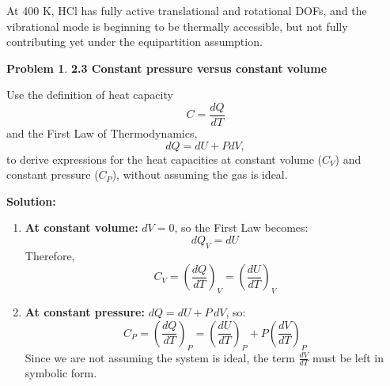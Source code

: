 \documentclass[12pt]{article}
\title{}
\author{Jerich Lee}
\date{\today}
\theoremstyle{definition} %
\newtheorem{problem}{Problem}
\theoremstyle{plain} %
\begin{document}
\maketitle
At 400 K, HCl has fully active translational and rotational DOFs, and the vibrational mode is beginning to be thermally accessible, but not fully contributing yet under the equipartition assumption.

\begin{problem}
    \textbf{2.3 Constant pressure versus constant volume}

    Use the definition of heat capacity
    \[
        C = \frac{dQ}{dT}
    \]
    and the First Law of Thermodynamics,
    \[
        dQ = dU + PdV,
    \]
    to derive expressions for the heat capacities at constant volume (\(C_V\)) and constant pressure (\(C_P\)), without assuming the gas is ideal.

    \textbf{Solution:}

    \begin{enumerate}
        \item \textbf{At constant volume:} \(dV = 0\), so the First Law becomes:
        \[
            dQ_V = dU
        \]
        Therefore,
        \[
            C_V = \left( \frac{dQ}{dT} \right)_V = \left( \frac{dU}{dT} \right)_V
        \]

        \item \textbf{At constant pressure:} \(dQ = dU + P\,dV\), so:
        \[
            C_P = \left( \frac{dQ}{dT} \right)_P = \left( \frac{dU}{dT} \right)_P + P \left( \frac{dV}{dT} \right)_P
        \]
        Since we are not assuming the system is ideal, the term \( \frac{dV}{dT} \) must be left in symbolic form.
    \end{enumerate}
\end{problem}
\end{document}

